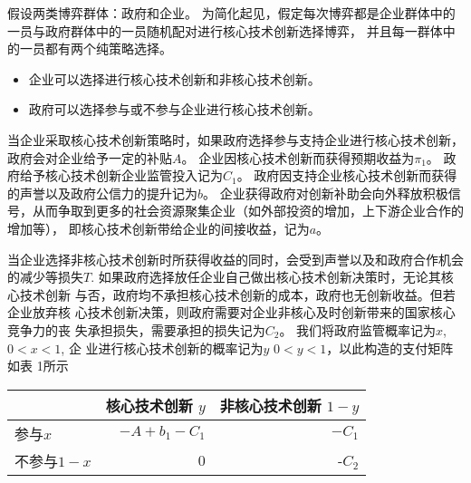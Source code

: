 \documentclass[UTF8]{ctexart}
\begin{document}
假设两类博弈群体：政府和企业。
为简化起见，假定每次博弈都是企业群体中的一员与政府群体中的一员随机配对进行核心技术创新选择博弈，
并且每一群体中的一员都有两个纯策略选择。

\begin{itemize}
\item 企业可以选择进行核心技术创新和非核心技术创新。
\item 政府可以选择参与或不参与企业进行核心技术创新。
\end{itemize}

当企业采取核心技术创新策略时，如果政府选择参与支持企业进行核心技术创新，政府会对企业给予一定的补贴$A$。
企业因核心技术创新而获得预期收益为$\pi_1$。
政府给予核心技术创新企业监管投入记为$C_1$。
政府因支持企业核心技术创新而获得的声誉以及政府公信力的提升记为$b$。
企业获得政府对创新补助会向外释放积极信号，从而争取到更多的社会资源聚集企业（如外部投资的增加，上下游企业合作的增加等），
即核心技术创新带给企业的间接收益，记为$a$。

当企业选择非核心技术创新时所获得收益的同时，会受到声誉以及和政府合作机会的减少等损失$T$.
如果政府选择放任企业自己做出核心技术创新决策时，无论其核心技术创新
与否，政府均不承担核心技术创新的成本，政府也无创新收益。但若企业放弃核
心技术创新决策，则政府需要对企业非核心及时创新带来的国家核心竞争力的丧
失承担损失，需要承担的损失记为$C_2$。
我们将政府监管概率记为$x$, $0 < x < 1$, 企
业进行核心技术创新的概率记为$y$ $0 < y < 1$，以此构造的支付矩阵如表 1所示

\begin{tabular}{l|r|r}
             & 核心技术创新 $y$ & 非核心技术创新 $1-y$ \\
\hline
参与$x$      & $-A+b_1-C_1$ & $-C_1$ \\
\hline
不参与$1-x$  & 0 & -$C_2$ \\
\end{tabular}
\end{document}
